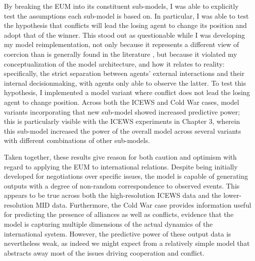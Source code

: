 By breaking the EUM into its constituent sub-models, I was able to explicitly test the assumptions each sub-model is based on. In particular, I was able to test the hypothesis that conflicts will lead the losing agent to change its position and adopt that of the winner. This stood out as questionable while I was developing my model reimplementation, not only because it represents a different view of coercion than is generally found in the literature \citep[e.g.][]{schelling_1966,bratton_2005}, but because it violated my conceptualization of the model architecture, and how it relates to reality: specifically, the strict separation between agents' external interactions and their internal decisionmaking, with agents only able to observe the latter. To test this hypothesis, I implemented a model variant where conflict does not lead the losing agent to change position. Across both the ICEWS and Cold War cases, model variants incorporating that new sub-model showed increased predictive power; this is particularly visible with the ICEWS experiments in Chapter 3, wherein this sub-model increased the power of the overall model across several variants with different combinations of other sub-models. 

Taken together, these results give reason for both caution and optimism with regard to applying the EUM to international relations. Despite being initially developed for negotiations over specific issues, the model is capable of generating outputs with a degree of non-random correspondence to observed events. This appears to be true across both the high-resolution ICEWS data and the lower-resolution MID data. Furthermore, the Cold War case provides information useful for predicting the presence of alliances as well as conflicts, evidence that the model is capturing multiple dimensions of the actual dynamics of the international system. However, the predictive power of these output data is nevertheless weak, as indeed we might expect from a relatively simple model that abstracts away most of the issues driving cooperation and conflict. 

